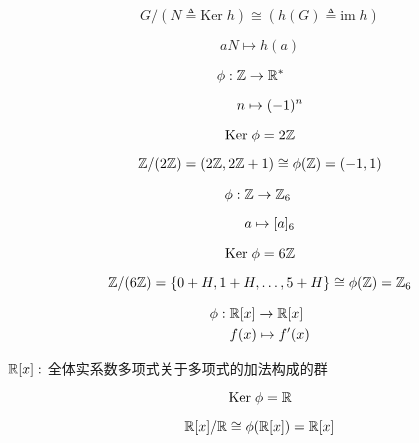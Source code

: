 \begin{frame}
  \[
    G/(N \triangleq \text{Ker}\; h) \cong (h(G) \triangleq \text{im}\; h)
  \]


  \vspace{-0.80cm}
  \[
    aN \mapsto h(a)
  \]
\end{frame}

\begin{frame}{}
  \begin{align*}
    \phi:\; & \mathbb{Z} \to \mathbb{R}^{\ast} \\[6pt]
            & n \mapsto (-1)^{n}
  \end{align*}

  \[
    \text{Ker}\; \phi = 2\mathbb{Z}
  \]

  \pause
  \[
    \mathbb{Z}/(2\mathbb{Z}) = (2\mathbb{Z}, 2\mathbb{Z} + 1) \cong \phi(\mathbb{Z}) = (-1, 1)
  \]
\end{frame}

\begin{frame}{}
  \begin{align*}
    \phi:\; & \mathbb{Z} \to \mathbb{Z}_{6} \\[6pt]
            & a \mapsto [a]_{6}
  \end{align*}

  \[
    \text{Ker}\; \phi = 6\mathbb{Z}
  \]

  \pause
  \[
    \mathbb{Z}/(6\mathbb{Z}) = \{0 + H, 1 + H, \dots, 5 + H\} \cong \phi(\mathbb{Z}) = \mathbb{Z}_{6}
  \]
\end{frame}

\begin{frame}{}
  \begin{align*}
    \phi:\; & \mathbb{R}[x] \to \mathbb{R}[x] \\
            & f(x) \mapsto f'(x)
  \end{align*}

  \vspace{0.30cm}
  \begin{center}
    $\mathbb{R}[x]:$ 全体实系数多项式关于多项式的加法构成的群
  \end{center}

  \[
    \text{Ker}\; \phi = \mathbb{R}
  \]

  \pause
  \[
    \mathbb{R}[x]/\mathbb{R} \cong \phi(\mathbb{R}[x]) = \mathbb{R}[x]
  \]
\end{frame}
